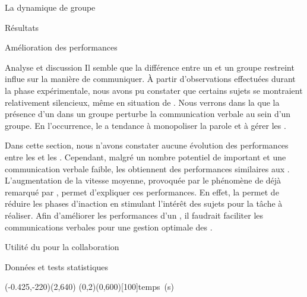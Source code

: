 \documentclass[myfrancais]{mythesis}
\begin{document}
\begin{mychapter}{La dynamique de groupe}
\begin{mysection}{Résultats}
\begin{mysubsection}{Amélioration des performances}
\begin{mysubsubsection}{Analyse et discussion}
					Il semble que la différence entre un  et un groupe restreint influe sur la manière de communiquer.
					À partir d'observations effectuées durant la phase expérimentale, nous avons pu constater que certains sujets se montraient relativement silencieux, même en situation de .
					Nous verrons dans la  que la présence d'un  dans un groupe perturbe la communication verbale au sein d'un groupe.
					En l'occurrence, le  a tendance à monopoliser la parole et à gérer les .

					Dans cette section, nous n'avons constater aucune évolution des performances entre les  et les .
					Cependant, malgré un nombre potentiel de  important et une communication verbale faible, les  obtiennent des performances similaires aux .
					L'augmentation de la vitesse moyenne, provoquée par le phénomène de  déjà remarqué par , permet d'expliquer ces performances.
					En effet, la  permet de réduire les phases d'inaction en stimulant l'intérêt des sujets pour la tâche à réaliser.
					Afin d'améliorer les performances d'un , il faudrait faciliter les communications verbales pour une gestion optimale des .
				\end{mysubsubsection}
			\end{mysubsection}
			\begin{mysubsection}{Utilité du \mybrainstorming pour la collaboration}
				\begin{mysubsubsection}{Données et tests statistiques}
					\begin{myfigure}
						\begin{myps}(-0.425,-220)(2,640)
							\myaxes(0,2){\mybrainstorming}(0,600)[100]{temps~(s)}
						\end{myps}
					\end{myfigure}


\end{mysubsubsection}
\end{mysubsection}
\end{mysection}
\end{mychapter}
\end{document}
